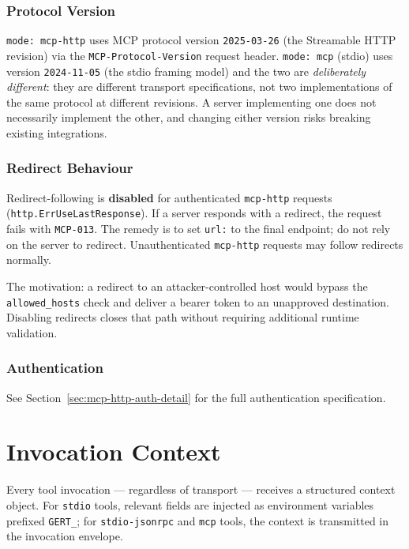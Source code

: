 \subsubsection{Protocol Version}
\label{sec:mcp-http-protocol-version}

\texttt{mode: mcp-http} uses MCP protocol version \texttt{2025-03-26} (the
Streamable HTTP revision) via the \texttt{MCP-Protocol-Version} request header.
\texttt{mode: mcp} (stdio) uses version \texttt{2024-11-05} (the stdio framing
model) and the two are \emph{deliberately different}: they are different
transport specifications, not two implementations of the same protocol at
different revisions.  A server implementing one does not necessarily implement
the other, and changing either version risks breaking existing integrations.

\subsubsection{Redirect Behaviour}
\label{sec:mcp-http-redirects}

Redirect-following is \textbf{disabled} for authenticated \texttt{mcp-http}
requests (\texttt{http.ErrUseLastResponse}).  If a server responds with a
redirect, the request fails with \texttt{MCP-013}.  The remedy is to set
\texttt{url:} to the final endpoint; do not rely on the server to redirect.
Unauthenticated \texttt{mcp-http} requests may follow redirects normally.

The motivation: a redirect to an attacker-controlled host would bypass the
\texttt{allowed\_hosts} check and deliver a bearer token to an unapproved
destination.  Disabling redirects closes that path without requiring
additional runtime validation.

\subsubsection{Authentication}
\label{sec:mcp-http-auth}

See Section~\ref{sec:mcp-http-auth-detail} for the full authentication
specification.

\section{Invocation Context}
\label{sec:tool-context}

Every tool invocation — regardless of transport — receives a structured
context object.  For \texttt{stdio} tools, relevant fields are injected as
environment variables prefixed \texttt{GERT\_}; for \texttt{stdio-jsonrpc} and
\texttt{mcp} tools, the context is transmitted in the invocation envelope.

